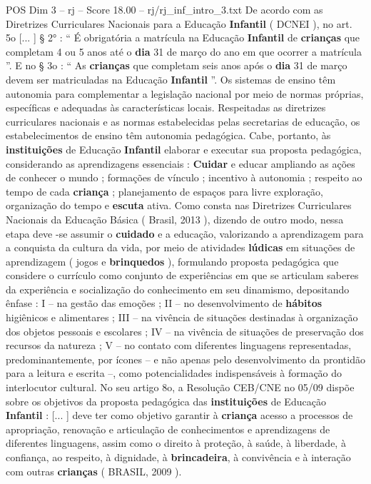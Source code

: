 \begin{textsample}{POS Dim 3 – rj – Score 18.00 – rj/rj\_inf\_intro\_3.txt}
De acordo com as Diretrizes Curriculares Nacionais para a Educação \textbf{Infantil} ( DCNEI ), no art. 5o [... ] § 2{\EmojiFont °} : “ É obrigatória a matrícula na Educação \textbf{Infantil} de \textbf{crianças} que completam 4 ou 5 anos até o \textbf{dia} 31 de março do ano em que ocorrer a matrícula ”.
E no § 3o : “ As \textbf{crianças} que completam seis anos após o \textbf{dia} 31 de março devem ser matriculadas na Educação \textbf{Infantil} ”.
Os sistemas de ensino têm autonomia para complementar a legislação nacional por meio de normas próprias, específicas e adequadas às características locais.
Respeitadas as diretrizes curriculares nacionais e as normas estabelecidas pelas secretarias de educação, os estabelecimentos de ensino têm autonomia pedagógica.
Cabe, portanto, às \textbf{instituições} de Educação \textbf{Infantil} elaborar e executar sua proposta pedagógica, considerando as aprendizagens essenciais : \textbf{Cuidar} e educar ampliando as ações de conhecer o mundo ; formações de vínculo ; incentivo à autonomia ; respeito ao tempo de cada \textbf{criança} ; planejamento de espaços para livre exploração, organização do tempo e \textbf{escuta} ativa.
Como consta nas Diretrizes Curriculares Nacionais da Educação Básica ( Brasil, 2013 ), dizendo de outro modo, nessa etapa deve -se assumir o \textbf{cuidado} e a educação, valorizando a aprendizagem para a conquista da cultura da vida, por meio de atividades \textbf{lúdicas} em situações de aprendizagem ( jogos e \textbf{brinquedos} ), formulando proposta pedagógica que considere o currículo como conjunto de experiências em que se articulam saberes da experiência e socialização do conhecimento em seu dinamismo, depositando ênfase : I – na gestão das emoções ; II – no desenvolvimento de \textbf{hábitos} higiênicos e alimentares ; III – na vivência de situações destinadas à organização dos objetos pessoais e escolares ; IV – na vivência de situações de preservação dos recursos da natureza ; V – no contato com diferentes linguagens representadas, predominantemente, por ícones – e não apenas pelo desenvolvimento da prontidão para a leitura e escrita –, como potencialidades indispensáveis à formação do interlocutor cultural.
No seu artigo 8o, a Resolução CEB/CNE no 05/09 dispõe sobre os objetivos da proposta pedagógica das \textbf{instituições} de Educação \textbf{Infantil} : [... ] deve ter como objetivo garantir à \textbf{criança} acesso a processos de apropriação, renovação e articulação de conhecimentos e aprendizagens de diferentes linguagens, assim como o direito à proteção, à saúde, à liberdade, à confiança, ao respeito, à dignidade, à \textbf{brincadeira}, à convivência e à interação com outras \textbf{crianças} ( BRASIL, 2009 ).

\end{textsample}

